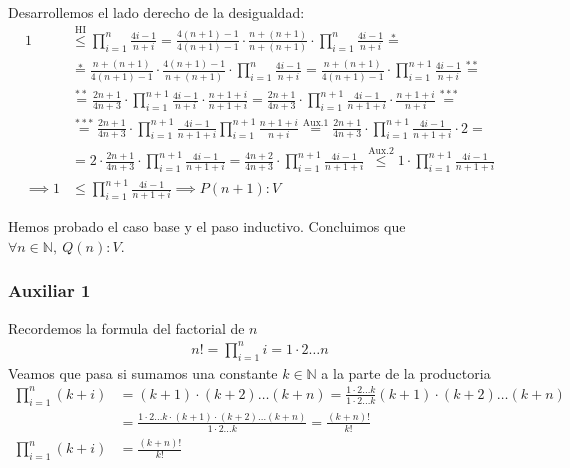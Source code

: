 \begin{enumerate}[label=\roman*)]
\begin{enumerate}[label=\arabic*)]
        Desarrollemos el lado derecho de la desigualdad:
        \begin{align*}
            1 &\overset{\text{HI}}{\leq} \prod_{i=1}^{n}\frac{4i-1}{n+i} = \frac{4(n+1)-1}{4(n+1)-1} \cdot
            \frac{n + (n+1)}{n + (n+1)} \cdot \prod_{i=1}^{n}\frac{4i-1}{n+i} \overset{*}{=} \\
            &\overset{*}{=}\frac{n+(n+1)}{4(n+1)-1} \cdot
            \frac{4(n+1)-1}{n+(n+1)} \cdot \prod_{i=1}^{n}\frac{4i-1}{n+i} = \frac{n+(n+1)}{4(n+1)-1} \cdot 
            \prod_{i=1}^{n+1}\frac{4i-1}{n+i} \overset{**}{=} \\
            &\overset{**}{=} \frac{2n+1}{4n+3} \cdot \prod_{i=1}^{n+1}\frac{4i-1}{n+i} \cdot \frac{n+1+i}{n+1+i}
            = \frac{2n+1}{4n+3} \cdot \prod_{i=1}^{n+1}\frac{4i-1}{n+1+i} \cdot \frac{n+1+i}{n+i} \overset{***}{=} \\
            &\overset{***}{=} \frac{2n+1}{4n+3} \cdot \prod_{i=1}^{n+1}\frac{4i-1}{n+1+i} 
            \prod_{i=1}^{n+1} \frac{n+1+i}{n+i} \overset{\text{Aux.1}}{=} \frac{2n+1}{4n+3} \cdot 
            \prod_{i=1}^{n+1}\frac{4i-1}{n+1+i} \cdot 2 = \\
            &= 2 \cdot \frac{2n+1}{4n+3} \cdot \prod_{i=1}^{n+1}\frac{4i-1}{n+1+i} = \frac{4n+2}{4n+3} \cdot 
            \prod_{i=1}^{n+1}\frac{4i-1}{n+1+i} \overset{\text{Aux.2}}{\leq} 1 \cdot 
            \prod_{i=1}^{n+1}\frac{4i-1}{n+1+i} \\
            \implies 1 &\leq \prod_{i=1}^{n+1}\frac{4i-1}{n+1+i} \implies P(n+1):V 
        \end{align*}
    \end{enumerate}

    Hemos probado el caso base y el paso inductivo. Concluimos que $\forall n \in \mathbb{N}, \ Q(n): V$.
    
    \subsubsection*{Auxiliar 1}
    Recordemos la formula del factorial de $n$
    \begin{align*}
        n! = \prod_{i=1}^{n} i = 1 \cdot 2 \dots n
    \end{align*}
    Veamos que pasa si sumamos una constante $k \in \mathbb{N}$ a la parte de la productoria
    \begin{align*}
        \prod_{i=1}^{n} (k + i) &= (k+1) \cdot (k+2) \dots (k+n) = \frac{1 \cdot 2 \dots k}{1 \cdot 2 \dots k} 
        (k+1) \cdot (k+2) \dots (k+n) \\
        &= \frac{1 \cdot 2 \dots k \cdot (k+1) \cdot (k+2) \dots (k+n)}{1 \cdot 2 \dots k} = \frac{(k+n)!}{k!} \\
        \prod_{i=1}^{n} (k + i) &= \frac{(k+n)!}{k!}
    \end{align*}


\end{enumerate}
